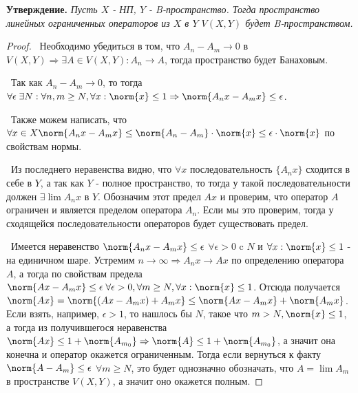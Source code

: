 \noindent\textbf{Утверждение.}\textit{ Пусть $X$ - НП, $Y$ - B-пространство. Тогда пространство линейных ограниченных операторов из $X$ в $Y$ $V(X, Y)$ будет 
B-пространством.}

\begin{proof}
\smallskip
\par\noindent\textbullet~Необходимо убедиться в том, что $A_n - A_m \to 0$ в $V(X, Y) \Rightarrow \exists A \in V(X, Y) : A_n \to A$, тогда пространство будет Банаховым.

\smallskip
\noindent\textbullet~Так как $A_n - A_m \to 0$, то тогда $\forall \epsilon \; \exists N : \forall n, m \ge N, \forall x : \norm{x} \le 1 \Rightarrow \norm{A_n x - A_m x} 
\le \epsilon$. 

\smallskip
\noindent\textbullet~Также можем написать, что $\forall x \in X \norm{A_n x - A_m x} \le \norm{A_n - A_m} \cdot \norm{x} \le \epsilon \cdot \norm{x}$ по свойствам нормы.

\smallskip
\noindent\textbullet~Из последнего неравенства видно, что $\forall x$ последовательность $\{ A_n x\}$ сходится в себе в $Y$, а так как $Y$ - полное пространство, то 
тогда у такой последовательности 
должен $\exists \lim A_n x$ в $Y$. Обозначим этот предел $A x$ и проверим, что оператор $A$ ограничен и является пределом оператора $A_n$. Если мы это проверим, тогда 
у сходящейся последовательности операторов будет существовать предел. 

\smallskip
\noindent\textbullet~Имеется неравенство $\norm{A_n x - A_m x} \le \epsilon$ $\forall \epsilon > 0$ c $N$ и $\forall x : \norm{x} \le 1$ - на единичном шаре. Устремим 
$n \to \infty \Rightarrow A_n x \to A x$ по определению оператора $A$, а тогда по свойствам предела $\norm{A x - A_m x} \le \epsilon \; \forall \epsilon > 0, \forall m 
\ge N, \forall x : \norm{x} \le 1$. Отсюда получается $\norm{A x} = \norm{(A x - A_m x) + A_m x} \le \norm{A x - A_m x} + \norm{A_m x}$. Если взять, например, $\epsilon 
> 1$, то нашлось бы $N$, такое что $m > N, \norm{x} \le 1$, а тогда из получившегося неравенства $\norm{A x} \le 1 + \norm{A_{m_0}} \Rightarrow \norm{A} \le 1 + \norm{A_{m_0}}$, 
а значит она конечна и оператор окажется ограниченным. Тогда если вернуться к факту $\norm{A - A_m} \le \epsilon$ $\forall m \ge N$, это будет однозначно обозначать, что
$A = \lim A_m$ в пространстве $V(X, Y)$, а значит оно окажется полным.
\end{proof}
